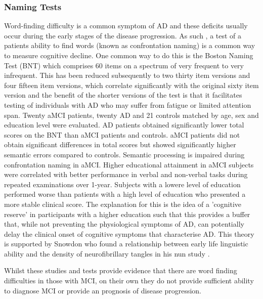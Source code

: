 \documentclass{article}
\begin{document}
\subsubsection{Naming Tests}
Word-finding difficulty is a common symptom of AD and these deficits usually occur during the early stages of the disease progression. As such , a test of a patients ability to find words (known as confrontation naming) is a common way to measure cognitive decline. One common way to do this is the Boston Naming Test (BNT) which comprises 60 items on a spectrum of very frequent to very infrequent. This has been reduced subsequently to two thirty item versions and four fifteen item versions, which correlate significantly with the original sixty item version and the benefit of the shorter versions of the test is that it facilitates testing of individuals with AD who may suffer from fatigue or limited attention span. 
Twenty aMCI patients, twenty AD and 21 controls matched by age, sex and education level were evaluated. AD patients obtained significantly lower total scores on the BNT than aMCI patients and controls. aMCI patients did not obtain significant differences in total scores but showed significantly higher semantic errors compared to controls. Semantic processing is impaired during confrontation naming in aMCI.
Higher educational attainment in aMCI subjects were correlated with better performance in verbal and non-verbal tasks during repeated examinations over 1-year. Subjects with a lowere level of education performed worse than patients with a high level of education who presented a more stable clinical score. The explanation for this is the idea of a 'cognitive reserve' in participants with a higher education such that this provides a buffer that, while not preventing the physiological symptoms of AD, can potentially delay the clinical onset of cognitive symptoms that characterise AD. This theory is supported by Snowdon who found a relationship between early life linguistic ability and the density of neurofibrillary tangles in his nun study \cite{Snowdon1996}.

Whilst these studies and tests provide evidence that there are word finding difficulties in those with MCI, on their own they do not provide sufficient ability to diagnose MCI or provide an prognosis of disease progression.
\end{document}

